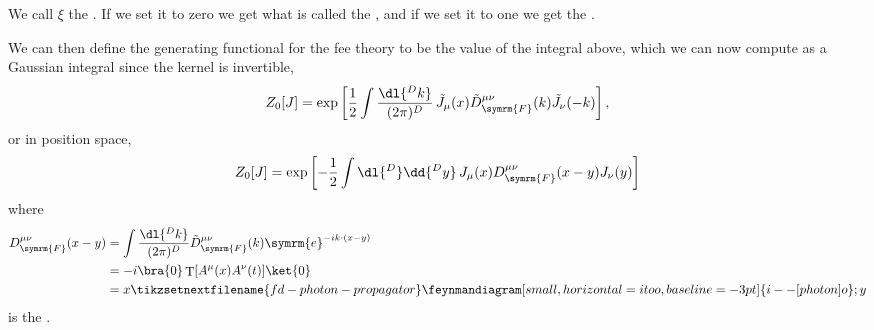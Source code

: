 \documentclass[fleqn]{NotesClass}
\newcommand{\e}{\symrm{e}}
\DeclareMathOperator{\timeOrdering}{T}
\newcommand{\feynman}{\symrm{F}}
\begin{document}
    We call \(\xi\) the .
    If we set it to zero we get what is called the , and if we set it to one we get the .
    
    We can then define the generating functional for the fee theory to be the value of the integral above, which we can now compute as a Gaussian integral since the kernel is invertible,
    \begin{equation}
        Z_0[J] = \exp\left[ \frac{1}{2} \int \frac{\dl{^{D}k}}{(2\pi)^D} \, \tilde{J}_\mu(x) \tilde{D}_{\feynman}^{\mu\nu}(k) \tilde{J}_\nu(-k) \right],
    \end{equation}
    or in position space,
    \begin{equation}
        Z_0[J] = \exp\left[ -\frac{1}{2} \int \dl{^D} \dd{^Dy} \, J_\mu(x) D_{\feynman}^{\mu\nu}(x - y) J_\nu(y)  \right]
    \end{equation}
    where
    \begin{align}
        D^{\mu\nu}_{\feynman}(x - y) &= \int \frac{\dl{^Dk}}{(2\pi)^D} \tilde{D}_{\feynman}^{\mu\nu}(k) \e^{-ik\cdot (x - y)}\\
        &= -i \bra{0} \timeOrdering [A^\mu(x)A^\nu(t)] \ket{0}\\
        &= x
        \tikzsetnextfilename{fd-photon-propagator}
        \feynmandiagram[small, horizontal=i to o, baseline=-3pt]{i -- [photon] o};
        y
    \end{align}
    is the .
    
    
    \appendixpage
    \begin{appendices}
        
        
        
    \end{appendices}
    
    \backmatter
    \renewcommand{\glossaryname}{Acronyms}
    \printglossary[acronym]
    \printindex
\end{document}
